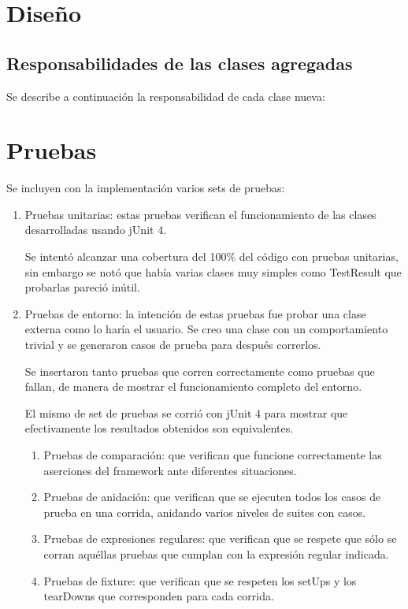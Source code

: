 \documentclass[12pt]{article}
\begin{document}
	
\section{Diseño}

\subsection{Responsabilidades de las clases agregadas}
Se describe a continuación la responsabilidad de cada clase nueva:
\begin{itemize}
\end{itemize}

\section{Pruebas}
Se incluyen con la implementación varios sets de pruebas:

	\begin{enumerate}
	\item Pruebas unitarias: estas pruebas verifican el funcionamiento de 
	las clases desarrolladas usando jUnit 4. 
	
	Se intentó alcanzar una cobertura del 100\% del código con pruebas 
	unitarias, sin embargo se notó que había varias clases muy simples como 
	TestResult que probarlas pareció inútil.

	\item Pruebas de entorno: la intención de estas pruebas fue probar una 
	clase externa como lo haría el usuario.
	Se creo una clase con un comportamiento trivial y se generaron casos de
	prueba para después correrlos. 
	
	Se insertaron tanto pruebas que corren correctamente como pruebas que
	fallan, de manera de mostrar el funcionamiento completo del entorno.
	
	El mismo de set de pruebas se corrió con jUnit 4 para mostrar que 
	efectivamente los resultados obtenidos son equivalentes.
		\begin{enumerate}
		\item Pruebas de comparación: que verifican que funcione 
		correctamente las aserciones del framework ante diferentes 
		situaciones.
		\item Pruebas de anidación: que verifican que se ejecuten todos
		los casos de prueba en una corrida, anidando varios niveles
		de suites con casos.
		\item Pruebas de expresiones regulares: que verifican que se
		respete que sólo se corran aquéllas pruebas que cumplan con
		la expresión regular indicada.
		\item Pruebas de fixture: que verifican que se respeten los setUps
		y los tearDowns que corresponden para cada corrida.
		\end{enumerate}
	\end{enumerate}
\end{document}
